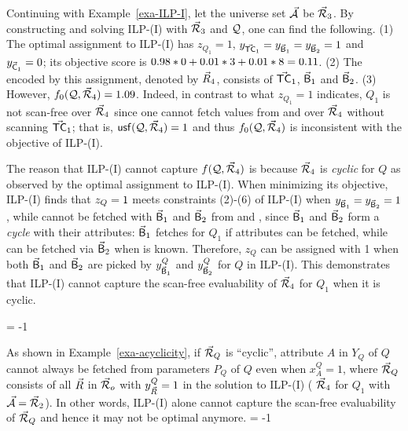 \begin{example}\label{exa-acyclicity}
Continuing with Example~\ref{exa-ILP-I}, let
the universe set $\vec{{\mathcal A}}$   be $\vec{{\mathcal R}}_{3}$.
By constructing and solving ILP-(I) with $\vec{{\mathcal R}}_{3}$ and $\mathcal Q$,
one can find the following.
(1) The optimal assignment to ILP-(I) has
$z_{Q_{1}} = 1$, $y_{\vec{\protect\mathsf{TC}}_{1}} = y_{\vec{\protect\mathsf{B}}_{1}} =
y_{\vec{\protect\mathsf{B}}_{2}} = 1$ and $y_{\vec{\protect\mathsf{C}}_{1}} = 0$; its
objective score is $0.98*0\allowbreak +\allowbreak 0.01*3\allowbreak +\allowbreak 0.01*8\allowbreak =\allowbreak
0.11$.
(2) The \bds encoded by this assignment, denoted by $\vec{R}_{4}$,
consists of $\vec{\protect\mathsf{TC}}_{1}$, $\vec{\protect\mathsf{B}}_{1}$ and
$\vec{\protect\mathsf{B}}_{2}$.
(3) However, $f_{0}(\mathcal Q, \vec{{\mathcal R}}_{4}) = 1.09$. Indeed, in contrast to
what $z_{Q_{1}}= 1$ indicates, $Q_{1}$ is not scan-free over
$\vec{{\mathcal R}}_{4}$ since one cannot fetch  values from
 and  over $\vec{{\mathcal R}}_{4}$ without scanning
$\vec{\protect\mathsf{TC}}_{1}$; that is, ${\mathsf{usf}}(\mathcal Q, \vec{{\mathcal R}}_{4}) = 1$ and
thus $f_{0}(\mathcal Q, \vec{{\mathcal R}}_{4})$ is inconsistent with the
objective of ILP-(I).

\vspace{0.6ex}
The reason that ILP-(I) cannot capture $f(\mathcal Q, \vec{{\mathcal R}}_{4})$ is
because $\vec{{\mathcal R}}_{4}$ is {\em cyclic} for $Q$ as observed by the optimal
assignment to ILP-(I). When minimizing its objective, ILP-(I)
finds that $z_{Q}\allowbreak =\allowbreak 1$ meets constraints (2)-(6) of ILP-(I)
when $y_{\vec{\protect\mathsf{B}}_{1}}\allowbreak =\allowbreak y_{\vec{\protect\mathsf{B}}_{2}}\allowbreak =\allowbreak 1$, while
 cannot be fetched with $\vec{\protect\mathsf{B}}_{1}$ and
$\vec{\protect\mathsf{B}}_{2}$ from  and , since
$\vec{\protect\mathsf{B}}_{1}$ and $\vec{\protect\mathsf{B}}_{2}$ form a {\em cycle} with
their attributes: $\vec{\protect\mathsf{B}}_{1}$ fetches  for $Q_{1}$
if  attributes can be fetched, while  can be
fetched via $\vec{\protect\mathsf{B}}_{2}$ when  is known. Therefore,
$z_{Q}$ can be assigned with 1 when both $\vec{\protect\mathsf{B}}_{1}$ and
$\vec{\protect\mathsf{B}}_{2}$ are picked by $y_{\vec{\protect\mathsf{B}}_{1}}^{Q}$ and
$y_{\vec{\protect\mathsf{B}}_{2}}^{Q}$ for $Q$ in ILP-(I). This demonstrates that ILP-(I)
cannot capture the scan-free evaluability of
$\vec{{\mathcal R}}_{4}$ for $Q_{1}$ when it is cyclic.
\end{example}
\looseness = -1

As shown in Example~\ref{exa-acyclicity}, if $\vec{{\mathcal R}}_{Q}$ is
``cyclic'', attribute $A$ in $Y_{Q}$ of $Q$ cannot always be
fetched from parameters $P_{Q}$ of $Q$ even when $x_{A}^{Q} = 1$,
where $\vec{{\mathcal R}}_{Q}$ consists of all \bss $\vec{R}$ in $\vec{{\mathcal R}}_{o}$
with $y_{\vec{R}}^{Q} = 1$ in the solution to ILP-(I) (\ie
$\vec{{\mathcal R}}_{4}$ for $Q_{1}$ with $\vec{{\mathcal A}} = \vec{{\mathcal R}}_{2}$).
In other words, ILP-(I) alone cannot capture the scan-free
evaluability of $\vec{{\mathcal R}}_{Q}$ and hence it may not be optimal anymore. 
\looseness = -1

